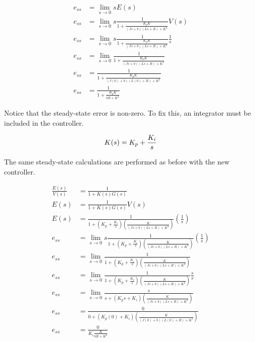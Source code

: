 \documentclass[10pt,conference,compsoc]{IEEEtran}
\begin{document}
\begin{align}
  e_{ss} &= \lim_{s\to0} sE(s) \nonumber \\
  e_{ss} &= \lim_{s\to0} s \frac{1}{1 + \frac{K_p K}{(Js+b)(Ls+R)+K^2}} V(s)
    \nonumber \\
  e_{ss} &= \lim_{s\to0} s \frac{1}{1 + \frac{K_p K}{(Js+b)(Ls+R)+K^2}}
    \frac{1}{s} \nonumber \\
  e_{ss} &= \lim_{s\to0} \frac{1}{1 + \frac{K_p K}{(Js+b)(Ls+R)+K^2}}
    \nonumber \\
  e_{ss} &= \frac{1}{1 + \frac{K_p K}{(J(0)+b)(L(0)+R)+K^2}} \nonumber \\
  e_{ss} &= \frac{1}{1 + \frac{K_p K}{bR+K^2}} \label{eq:ss_nonzero}
\end{align}

Notice that the \gls{steady-state error} is non-zero. To fix this, an integrator
must be included in the controller.

\begin{equation*}
  K(s) = K_p + \frac{K_i}{s} \\
\end{equation*}

The same steady-state calculations are performed as before with the new
controller.

\begin{align*}
  \frac{E(s)}{V(s)} &= \frac{1}{1 + K(s)G(s)} \\
  E(s) &= \frac{1}{1 + K(s)G(s)} V(s) \\
  E(s) &= \frac{1}{1 + \left(K_p + \frac{K_i}{s}\right)
    \left(\frac{K}{(Js+b)(Ls+R)+K^2}\right)} \left(\frac{1}{s}\right) \\
  e_{ss} &= \lim_{s\to0} s \frac{1}{1 + \left(K_p + \frac{K_i}{s}\right)
    \left(\frac{K}{(Js+b)(Ls+R)+K^2}\right)} \left(\frac{1}{s}\right) \\
  e_{ss} &= \lim_{s\to0} \frac{1}{1 + \left(K_p + \frac{K_i}{s}\right)
    \left(\frac{K}{(Js+b)(Ls+R)+K^2}\right)} \\
  e_{ss} &= \lim_{s\to0} \frac{1}{1 + \left(K_p + \frac{K_i}{s}\right)
    \left(\frac{K}{(Js+b)(Ls+R)+K^2}\right)} \frac{s}{s} \\
  e_{ss} &= \lim_{s\to0} \frac{s}{s + \left(K_p s + K_i\right)
    \left(\frac{K}{(Js+b)(Ls+R)+K^2}\right)} \\
  e_{ss} &= \frac{0}{0 + (K_p (0) + K_i)
    \left(\frac{K}{(J(0)+b)(L(0)+R)+K^2}\right)} \\
  e_{ss} &= \frac{0}{K_i \frac{K}{bR+K^2}} \\
\end{align*}
\end{document}
